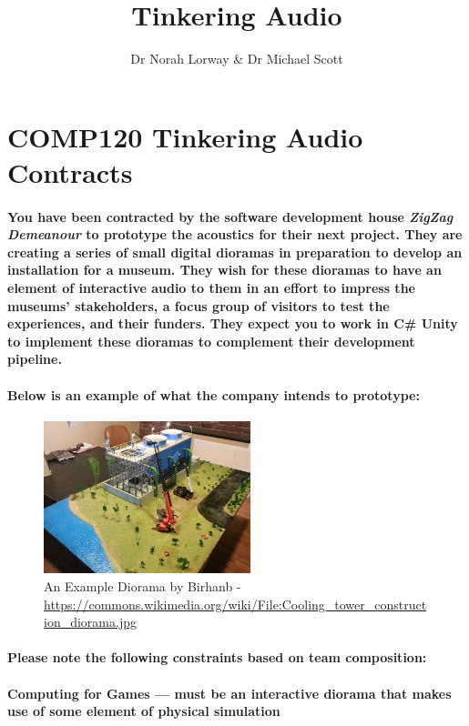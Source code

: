 \documentclass{../../fal_assignment}
\title{Tinkering Audio}
\author{Dr Norah Lorway \& Dr Michael Scott}
\begin{document}
\section*{COMP120 Tinkering Audio Contracts}

\paragraph{You have been contracted by the software development house \textit{ZigZag Demeanour} to prototype the acoustics for their next project. They are creating a series of small digital dioramas in preparation to develop an installation for a museum. They wish for these dioramas to have an element of interactive audio to them in an effort to impress the museums' stakeholders, a focus group of visitors to test the experiences, and their funders. They expect you to work in C\# Unity to implement these dioramas to complement their development pipeline.}

\paragraph{Below is an example of what the company intends to prototype:}

\begin{figure}[h]
\centering
\includegraphics[width=6cm]{example_diorama}
\caption{An Example Diorama by Birhanb - \url{https://commons.wikimedia.org/wiki/File:Cooling\_tower\_construction\_diorama.jpg}}
\end{figure}

\paragraph{Please note the following constraints based on team composition:}

\paragraph{\textbf{Computing for Games} --- must be an interactive diorama that makes use of some element of physical simulation}
\end{document}
